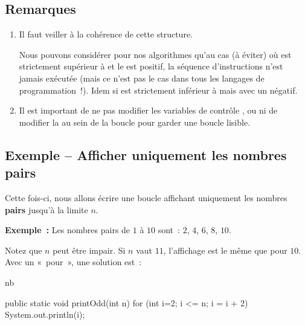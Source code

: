 	\subsection{Remarques}

	\begin{enumerate}
	
		\item Il faut veiller à la cohérence de cette structure. 
		
			Nous pouvons considérer pour nos algorithmes qu’au cas (à éviter) où
			 est strictement supérieur à  et le  est
			positif, la séquence d’instructions n’est jamais exécutée (mais ce
			n’est pas le cas dans tous les langages de programmation~!). Idem si
			 est strictement inférieur à  mais avec un
			 négatif.


		\item Il est important de ne pas modifier les variables de contrôle
			,  ou  ni de modifier la  au
			sein de la boucle pour garder une boucle lisible.

	\end{enumerate}

		
	
		
	
	\subsection{Exemple -- Afficher uniquement les nombres pairs}

		Cette fois-ci, nous allons écrire une boucle affichant uniquement 
		les nombres \textbf{pairs} jusqu’à la limite $n$.
		
		\textbf{Exemple~:}
		Les nombres pairs de $1$ à $10$ sont~: $2$, $4$, $6$, $8$, $10$.
		
		Notez que $n$ peut être impair. 
		Si $n$ vaut $11$, l’affichage est le même que pour $10$.
		Avec un «~pour~», une solution est~:

		\begin{pseudocode}
				\Write nb 
			\EndFor
		\EndAlgo
		\end{pseudocode}

		\begin{java}
public static void printOdd(int n){
	for (int i=2; i <= n; i = i + 2){
		System.out.println(i);
	}
}
		\end{java}


